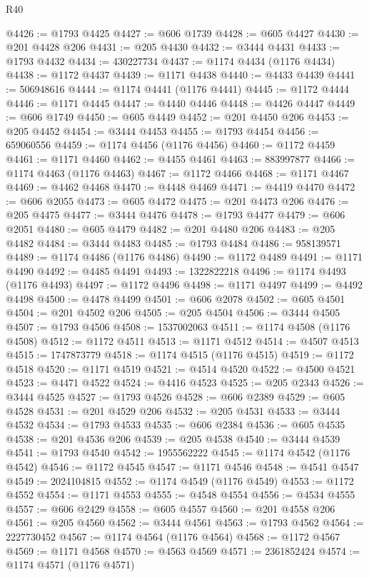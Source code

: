 \begin{lexlean}{R40}
\begin{coremodule}
@4426 := @1793 @4425
@4427 := @606 @1739
@4428 := @605 @4427
@4430 := @201 @4428 @206
@4431 := @205 @4430
@4432 := @3444 @4431
@4433 := @1793 @4432
@4434 := 430227734
@4437 := @1174 @4434 (@1176 @4434)
@4438 := @1172 @4437
@4439 := @1171 @4438
@4440 := @4433 @4439
@4441 := 506948616
@4444 := @1174 @4441 (@1176 @4441)
@4445 := @1172 @4444
@4446 := @1171 @4445
@4447 := @4440 @4446
@4448 := @4426 @4447
@4449 := @606 @1749
@4450 := @605 @4449
@4452 := @201 @4450 @206
@4453 := @205 @4452
@4454 := @3444 @4453
@4455 := @1793 @4454
@4456 := 659060556
@4459 := @1174 @4456 (@1176 @4456)
@4460 := @1172 @4459
@4461 := @1171 @4460
@4462 := @4455 @4461
@4463 := 883997877
@4466 := @1174 @4463 (@1176 @4463)
@4467 := @1172 @4466
@4468 := @1171 @4467
@4469 := @4462 @4468
@4470 := @4448 @4469
@4471 := @4419 @4470
@4472 := @606 @2055
@4473 := @605 @4472
@4475 := @201 @4473 @206
@4476 := @205 @4475
@4477 := @3444 @4476
@4478 := @1793 @4477
@4479 := @606 @2051
@4480 := @605 @4479
@4482 := @201 @4480 @206
@4483 := @205 @4482
@4484 := @3444 @4483
@4485 := @1793 @4484
@4486 := 958139571
@4489 := @1174 @4486 (@1176 @4486)
@4490 := @1172 @4489
@4491 := @1171 @4490
@4492 := @4485 @4491
@4493 := 1322822218
@4496 := @1174 @4493 (@1176 @4493)
@4497 := @1172 @4496
@4498 := @1171 @4497
@4499 := @4492 @4498
@4500 := @4478 @4499
@4501 := @606 @2078
@4502 := @605 @4501
@4504 := @201 @4502 @206
@4505 := @205 @4504
@4506 := @3444 @4505
@4507 := @1793 @4506
@4508 := 1537002063
@4511 := @1174 @4508 (@1176 @4508)
@4512 := @1172 @4511
@4513 := @1171 @4512
@4514 := @4507 @4513
@4515 := 1747873779
@4518 := @1174 @4515 (@1176 @4515)
@4519 := @1172 @4518
@4520 := @1171 @4519
@4521 := @4514 @4520
@4522 := @4500 @4521
@4523 := @4471 @4522
@4524 := @4416 @4523
@4525 := @205 @2343
@4526 := @3444 @4525
@4527 := @1793 @4526
@4528 := @606 @2389
@4529 := @605 @4528
@4531 := @201 @4529 @206
@4532 := @205 @4531
@4533 := @3444 @4532
@4534 := @1793 @4533
@4535 := @606 @2384
@4536 := @605 @4535
@4538 := @201 @4536 @206
@4539 := @205 @4538
@4540 := @3444 @4539
@4541 := @1793 @4540
@4542 := 1955562222
@4545 := @1174 @4542 (@1176 @4542)
@4546 := @1172 @4545
@4547 := @1171 @4546
@4548 := @4541 @4547
@4549 := 2024104815
@4552 := @1174 @4549 (@1176 @4549)
@4553 := @1172 @4552
@4554 := @1171 @4553
@4555 := @4548 @4554
@4556 := @4534 @4555
@4557 := @606 @2429
@4558 := @605 @4557
@4560 := @201 @4558 @206
@4561 := @205 @4560
@4562 := @3444 @4561
@4563 := @1793 @4562
@4564 := 2227730452
@4567 := @1174 @4564 (@1176 @4564)
@4568 := @1172 @4567
@4569 := @1171 @4568
@4570 := @4563 @4569
@4571 := 2361852424
@4574 := @1174 @4571 (@1176 @4571)

\end{coremodule}
\end{lexlean}
